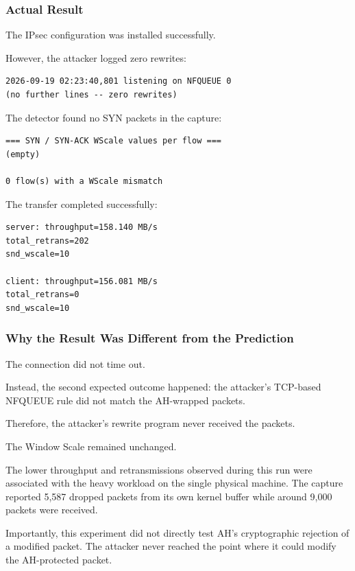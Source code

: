 \documentclass[11pt]{article}
\begin{document}
\subsubsection*{Actual Result}

The IPsec configuration was installed successfully.

However, the attacker logged zero rewrites:

\begin{lstlisting}
2026-09-19 02:23:40,801 listening on NFQUEUE 0
(no further lines -- zero rewrites)
\end{lstlisting}

The detector found no SYN packets in the capture:

\begin{lstlisting}
=== SYN / SYN-ACK WScale values per flow ===
(empty)

0 flow(s) with a WScale mismatch
\end{lstlisting}

The transfer completed successfully:

\begin{lstlisting}
server: throughput=158.140 MB/s
total_retrans=202
snd_wscale=10

client: throughput=156.081 MB/s
total_retrans=0
snd_wscale=10
\end{lstlisting}

\subsubsection*{Why the Result Was Different from the Prediction}

The connection did not time out.

Instead, the second expected outcome happened: the attacker's
TCP-based NFQUEUE rule did not match the AH-wrapped packets.

Therefore, the attacker's rewrite program never received the packets.

The Window Scale remained unchanged.

The lower throughput and retransmissions observed during this run
were associated with the heavy workload on the single physical
machine. The capture reported 5,587 dropped packets from its own
kernel buffer while around 9,000 packets were received.

Importantly, this experiment did not directly test AH's cryptographic
rejection of a modified packet. The attacker never reached the point
where it could modify the AH-protected packet.
\end{document}
